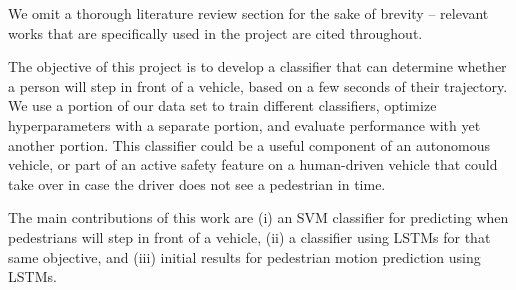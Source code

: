 We omit a thorough literature review section for the sake of brevity -- relevant works that are specifically used in the project are cited throughout.

The objective of this project is to develop a classifier that can determine whether a person will step in front of a vehicle, based on a few seconds of their trajectory.
We use a portion of our data set to train different classifiers, optimize hyperparameters with a separate portion, and evaluate performance with yet another portion.
This classifier could be a useful component of an autonomous vehicle, or part of an active safety feature on a human-driven vehicle that could take over in case the driver does not see a pedestrian in time.

The main contributions of this work are 
(i) an SVM classifier for predicting when pedestrians will step in front of a vehicle, (ii) a classifier using LSTMs for that same objective, and (iii) initial results for pedestrian motion prediction using LSTMs.











